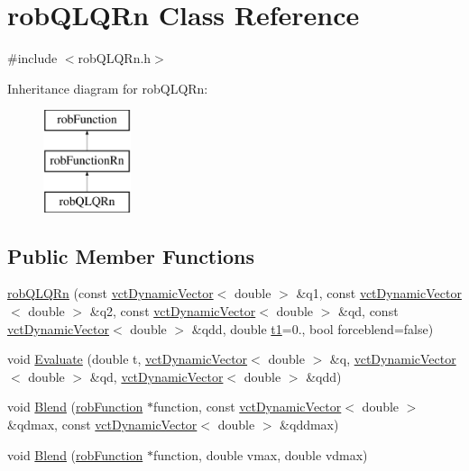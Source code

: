 \hypertarget{classrob_q_l_q_rn}{}\section{rob\+Q\+L\+Q\+Rn Class Reference}
\label{classrob_q_l_q_rn}


{\ttfamily \#include $<$rob\+Q\+L\+Q\+Rn.\+h$>$}

Inheritance diagram for rob\+Q\+L\+Q\+Rn\+:\begin{figure}[H]
\begin{center}
\leavevmode
\includegraphics[height=3.000000cm]{db/d15/classrob_q_l_q_rn}
\end{center}
\end{figure}
\subsection*{Public Member Functions}
\begin{DoxyCompactItemize}
\item 
\hyperlink{classrob_q_l_q_rn_a299164bc482585f56221e89e058329f5}{rob\+Q\+L\+Q\+Rn} (const \hyperlink{classvct_dynamic_vector}{vct\+Dynamic\+Vector}$<$ double $>$ \&q1, const \hyperlink{classvct_dynamic_vector}{vct\+Dynamic\+Vector}$<$ double $>$ \&q2, const \hyperlink{classvct_dynamic_vector}{vct\+Dynamic\+Vector}$<$ double $>$ \&qd, const \hyperlink{classvct_dynamic_vector}{vct\+Dynamic\+Vector}$<$ double $>$ \&qdd, double \hyperlink{classrob_function_a9a4b408a3a5a8ae927caec3b6bac36ef}{t1}=0., bool forceblend=false)
\item 
void \hyperlink{classrob_q_l_q_rn_a7b6b2be1b9bfb422e5425802a9ada0a9}{Evaluate} (double t, \hyperlink{classvct_dynamic_vector}{vct\+Dynamic\+Vector}$<$ double $>$ \&q, \hyperlink{classvct_dynamic_vector}{vct\+Dynamic\+Vector}$<$ double $>$ \&qd, \hyperlink{classvct_dynamic_vector}{vct\+Dynamic\+Vector}$<$ double $>$ \&qdd)
\item 
void \hyperlink{classrob_q_l_q_rn_a293fa3654f298455cb8a94b830de191e}{Blend} (\hyperlink{classrob_function}{rob\+Function} $\ast$function, const \hyperlink{classvct_dynamic_vector}{vct\+Dynamic\+Vector}$<$ double $>$ \&qdmax, const \hyperlink{classvct_dynamic_vector}{vct\+Dynamic\+Vector}$<$ double $>$ \&qddmax)
\item 
void \hyperlink{classrob_q_l_q_rn_a67ae06b5e9c39154632ff9a0fc6334f6}{Blend} (\hyperlink{classrob_function}{rob\+Function} $\ast$function, double vmax, double vdmax)
\end{DoxyCompactItemize}
